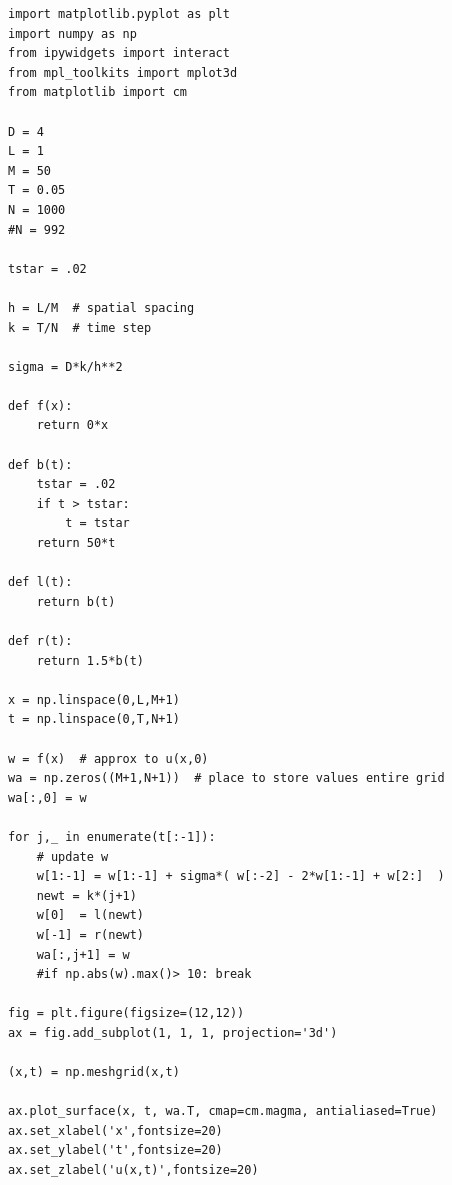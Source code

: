 \documentclass[12pt]{article}
\begin{document}
\begin{verbatim}
import matplotlib.pyplot as plt
import numpy as np
from ipywidgets import interact
from mpl_toolkits import mplot3d
from matplotlib import cm

D = 4
L = 1
M = 50
T = 0.05
N = 1000
#N = 992

tstar = .02

h = L/M  # spatial spacing
k = T/N  # time step

sigma = D*k/h**2

def f(x):
    return 0*x

def b(t):
    tstar = .02
    if t > tstar:
        t = tstar
    return 50*t

def l(t):
    return b(t)

def r(t):
    return 1.5*b(t)

x = np.linspace(0,L,M+1)
t = np.linspace(0,T,N+1)

w = f(x)  # approx to u(x,0)
wa = np.zeros((M+1,N+1))  # place to store values entire grid
wa[:,0] = w  

for j,_ in enumerate(t[:-1]):
    # update w
    w[1:-1] = w[1:-1] + sigma*( w[:-2] - 2*w[1:-1] + w[2:]  )
    newt = k*(j+1)
    w[0]  = l(newt)
    w[-1] = r(newt)
    wa[:,j+1] = w
    #if np.abs(w).max()> 10: break

fig = plt.figure(figsize=(12,12))
ax = fig.add_subplot(1, 1, 1, projection='3d')

(x,t) = np.meshgrid(x,t)

ax.plot_surface(x, t, wa.T, cmap=cm.magma, antialiased=True)
ax.set_xlabel('x',fontsize=20)
ax.set_ylabel('t',fontsize=20)
ax.set_zlabel('u(x,t)',fontsize=20)
\end{verbatim}
\end{document}
